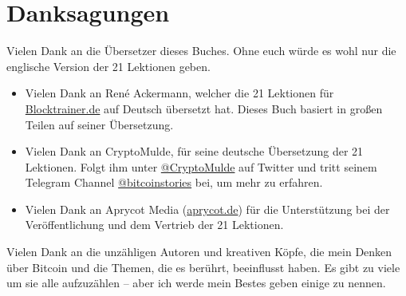 \chapter*{Danksagungen}

Vielen Dank an die Übersetzer dieses Buches. Ohne euch würde es wohl nur die englische Version der
21 Lektionen geben.

\begin{itemize}
  \item Vielen Dank an René Ackermann, welcher die 21 Lektionen für
  \href{https://blocktrainer.de}{Blocktrainer.de} auf Deutsch übersetzt hat.
  Dieses Buch basiert in großen Teilen auf seiner Übersetzung.
  \item Vielen Dank an CryptoMulde, für seine deutsche Übersetzung der 21
  Lektionen. Folgt ihm unter
  \href{https://twitter.com/CryptoMulde}{@CryptoMulde} auf Twitter und tritt
  seinem Telegram Channel
  \href{https://t.me/bitcoinstories}{@bitcoinstories} bei, um mehr zu erfahren.
  \item Vielen Dank an Aprycot Media (\href{https://www.aprycot.de}{aprycot.de})
  für die Unterstützung bei der Veröffentlichung und dem Vertrieb der 21
  Lektionen.
\end{itemize}


Vielen Dank an die unzähligen Autoren und kreativen Köpfe, die mein Denken über
Bitcoin und die Themen, die es berührt, beeinflusst haben. Es gibt zu viele um
sie alle aufzuzählen -- aber ich werde mein Bestes geben einige zu nennen.

